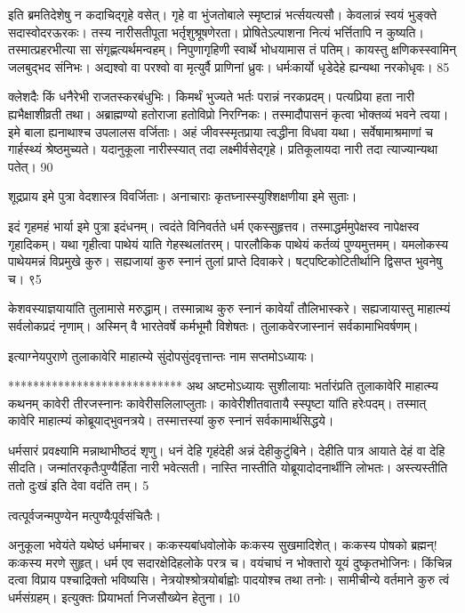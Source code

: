 इति ब्रमतिदेशेषु न कदाचिद्गृहे वसेत्।
गृहे वा भुंजतोबाले स्मृष्टान्नं भर्त्सयत्यसौ।
केवलान्नं स्वयं भुङ्क्ते सदास्वोदरऊरकः।
तस्य नारीसतीपूता भर्तृशुश्रूषणेरता।
प्रोषितेऽल्पाशना नित्यं भर्त्तितापि न कुष्यति।
तस्मात्प्रहरभीत्या सा संगृह्णत्यर्थमन्वहम्।
निपुणागृहिणी स्वार्थे भोधयामास तं पतिम्।
कायस्तु क्षणिकस्स्वामिन् जलबुद्भद संनिभः।
अद्यश्वो वा परश्वो वा मृत्युर्वै प्राणिनां ध्रुवः।
धर्मःकार्यो धृडेदेहे ह्यन्यथा नरकोधृवः।
85

क्लेशदैः किं धनैरेभी राजतस्करबंधुभिः।
किमर्थं भुज्यते भर्तः परान्नं नरकप्रदम्।
पत्यप्रिया हता नारी ह्यभैक्षाशीव्रती तथा।
अब्राह्मण्यो हतोराजा हतोविप्रो निरग्निकः।
तस्मादौपासनं कृत्वा भोक्तव्यं भवने त्वया।
इमे बाला ह्यनाथाश्च उपलालस वर्जिताः।
अहं जीवस्स्मृतप्राया त्वद्धीना विधवा यथा।
सर्वेषामाश्रमाणां च गार्हस्थ्यं श्रेष्ठमुच्यते।
यदानुकूला नारीस्स्यात् तदा लक्ष्मीर्वसेद्गृहे।
प्रतिकूलायदा नारी तदा त्याज्यान्यथा पतेत्।
90

शूद्रप्राय इमे पुत्रा वेदशास्त्र विवर्जिताः।
अनाचाराः कृतघ्नास्स्युश्शिक्षणीया इमे सुताः।

इदं गृहमहं भार्या इमे पुत्रा इदंधनम्।
त्वदंते विनिवर्तते धर्म एकस्सुहृत्तव।
तस्माद्धर्ममुपेक्षस्व नापेक्षस्व गृहादिकम्।
यथा गृहीत्वा पाथेयं याति गेहस्थलांतरम्।
पारलौकिक पाथेयं कर्तव्यं पुण्यमुत्तमम्।
यमलोकस्य पाथेयमन्नं विप्रमुखे कुरु।
सह्यजायां कुरु स्नानं तुलां प्राप्ते दिवाकरे।
षट्पष्टिकोटितीर्थानि द्विसप्त भुवनेषु च।
९5

केशवस्याज्ञयायांति तुलामासे मरुद्धाम्।
तस्मान्नाथ कुरु स्नानं कावेर्यां तौलिभास्करे।
सह्यजायास्तु माहात्म्यं सर्वलोकप्रदं नृणाम्।
अस्मिन् वै भारतेवर्षे कर्मभूमौ विशेषतः।
तुलाकवेरजास्नानं सर्वकामाभिवर्षणम्।

इत्याग्नेयपुराणे तुलाकावेरि माहात्म्ये सुंदोपसुंदवृत्तान्तः नाम सप्तमोऽध्यायः।

****************************
अथ अष्टमोऽध्यायः सुशीलायाः भर्तारंप्रति तुलाकावेरि माहात्म्य कथनम् कावेरी तीरजस्नानः कावेरीसलिलाप्लुताः।
कावेरीशीतवातायै स्स्पृष्टा यांति हरेःपदम्।
तस्मात् कावेरि माहात्म्यं कोब्रूयाद्भुवनत्रये।
तस्मात्तस्यां कुरु स्नानं सर्वकामार्थसिद्धये।

धर्मसारं प्रवक्ष्यामि मन्नाथाभीष्ठदं शृणु।
धनं देहि गृहंदेही अन्नं देहीकुटुंबिने।
देहीति पात्र आयाते देहं वा देहि सीदति।
जन्मांतरकृतैःपुण्यैर्हिता नारी भवेत्सती।
नास्ति नास्तीति योब्रूयादोदनार्थीनि लोभतः।
अस्त्यस्तीति ततो दुःखं इति देवा वदंति तम्।
5

त्वत्पूर्वजन्मपुण्येन मत्पुण्यैःपूर्वसंचितैः।

अनुकूला भवेयंते यथेष्ठं धर्ममाचर।
कःकस्यबांधवोलोके कःकस्य सुखमादिशेत्।
कःकस्य पोषको ब्रह्मन्! कःकस्य मरणे सुहृत्।
धर्म एव सदारक्षेदिहलोके परत्र च।
वयंचाघं न भोक्तारो यूयं दुष्कृतभोजिनः।
किंचिन्न दत्वा विप्राय पश्चाद्रिक्तो भविष्यसि।
नेत्रयोश्श्रोत्रयोर्बाह्वोः पादयोश्च तथा तनोः।
सामीचीन्ये वर्तमाने कुरु त्वं धर्मसंग्रहम्।
इत्युक्तः प्रियाभर्ता निजसौख्येन हेतुना।
10

